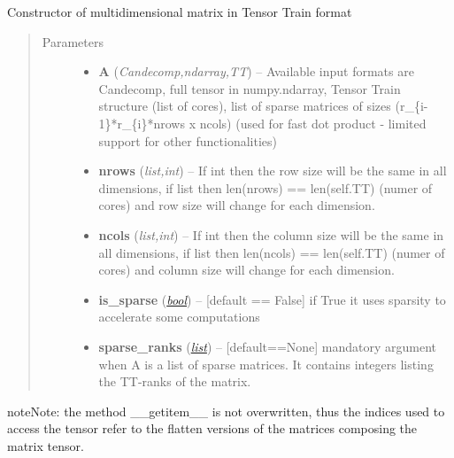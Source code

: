 \documentclass[a4paper,10pt,english]{sphinxmanual}
\begin{document}
\begin{fulllineitems}
\label{api-ttmat:TensorToolbox.core.TTmat}
Constructor of multidimensional matrix in Tensor Train format
\begin{quote}\begin{description}
\item[{Parameters}] \leavevmode\begin{itemize}
\item {} 
\textbf{A} (\emph{Candecomp,ndarray,TT}) -- Available input formats are Candecomp, full tensor in numpy.ndarray, Tensor Train structure (list of cores), list of sparse matrices of sizes (r\_\{i-1\}*r\_\{i\}*nrows x ncols) (used for fast dot product - limited support for other functionalities)

\item {} 
\textbf{nrows} (\emph{list,int}) -- If int then the row size will be the same in all dimensions, if list then len(nrows) == len(self.TT) (numer of cores) and row size will change for each dimension.

\item {} 
\textbf{ncols} (\emph{list,int}) -- If int then the column size will be the same in all dimensions, if list then len(ncols) == len(self.TT) (numer of cores) and column size will change for each dimension.

\item {} 
\textbf{is\_sparse} (\href{http://docs.python.org/library/functions.html\#bool}{\emph{bool}}) -- {[}default == False{]} if True it uses sparsity to accelerate some computations

\item {} 
\textbf{sparse\_ranks} (\href{http://docs.python.org/library/functions.html\#list}{\emph{list}}) -- {[}default==None{]} mandatory argument when A is a list of sparse matrices. It contains integers listing the TT-ranks of the matrix.

\end{itemize}

\end{description}\end{quote}

\begin{notice}{note}{Note:}
the method \_\_getitem\_\_ is not overwritten, thus the indices used to access the tensor refer to the flatten versions of the matrices composing the matrix tensor.
\end{notice}


\end{fulllineitems}
\end{document}
